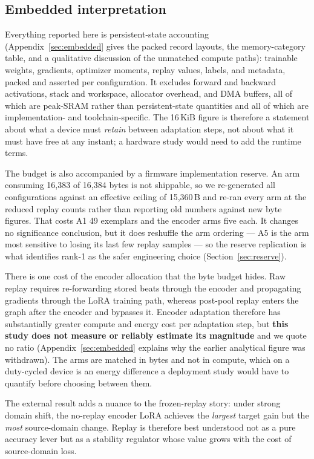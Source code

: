 \subsection{Embedded interpretation}

Everything reported here is persistent-state accounting (Appendix~\ref{sec:embedded}
gives the packed record layouts, the memory-category table, and a qualitative
discussion of the unmatched compute paths): trainable weights,
gradients, optimizer moments, replay values, labels, and metadata, packed and
asserted per configuration. It excludes forward and backward activations, stack
and workspace, allocator overhead, and DMA buffers, all of which are peak-SRAM
rather than persistent-state quantities and all of which are implementation- and
toolchain-specific. The 16\,KiB figure is therefore a statement about what a
device must \emph{retain} between adaptation steps, not about what it must have
free at any instant; a hardware study would need to add the runtime terms.

The budget is also accompanied by a firmware implementation reserve. An arm
consuming 16{,}383 of 16{,}384 bytes is not shippable, so we re-generated all
configurations against an effective ceiling of 15{,}360\,B and re-ran every arm
at the reduced replay counts rather than reporting old numbers against new byte
figures. That costs A1 49 exemplars and the encoder arms five each. It changes no
significance conclusion, but it does reshuffle the arm ordering --- A5 is the
arm most sensitive to losing its last few replay samples --- so the reserve
replication is what identifies rank-1 as the safer engineering choice
(Section~\ref{sec:reserve}).

There is one cost of the encoder allocation that the byte budget hides. Raw
replay requires re-forwarding stored beats through the encoder and propagating
gradients through the LoRA training path, whereas post-pool replay enters the
graph after the encoder and bypasses it. Encoder adaptation therefore has
substantially greater compute and energy cost per adaptation step, but
\textbf{this study does not measure or reliably estimate its magnitude} and we
quote no ratio (Appendix~\ref{sec:embedded} explains why the earlier analytical
figure was withdrawn). The arms are matched in bytes and not in compute, which on
a duty-cycled device is an energy difference a deployment study would have to
quantify before choosing between them.

The external result adds a nuance to the frozen-replay story: under strong domain
shift, the no-replay encoder LoRA achieves the \emph{largest} target gain but the
\emph{most} source-domain change. Replay is therefore best understood not as a pure
accuracy lever but as a stability regulator whose value grows with the cost of
source-domain loss.

